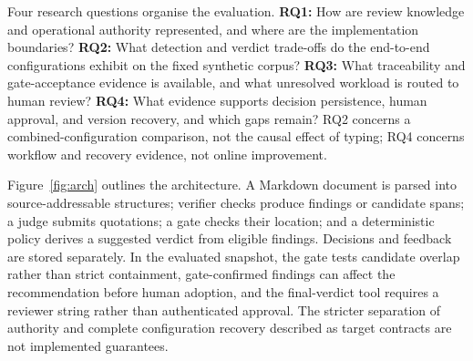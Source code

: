 \documentclass[computers,article,submit,moreauthors]{Definitions/mdpi}
\begin{document}
Four research questions organise the evaluation. \textbf{RQ1:} How are review knowledge and operational authority represented, and where are the implementation boundaries? \textbf{RQ2:} What detection and verdict trade-offs do the end-to-end configurations exhibit on the fixed synthetic corpus? \textbf{RQ3:} What traceability and gate-acceptance evidence is available, and what unresolved workload is routed to human review? \textbf{RQ4:} What evidence supports decision persistence, human approval, and version recovery, and which gaps remain? RQ2 concerns a combined-configuration comparison, not the causal effect of typing; RQ4 concerns workflow and recovery evidence, not online improvement.

Figure~\ref{fig:arch} outlines the architecture. A Markdown document is parsed into source-addressable structures; verifier checks produce findings or candidate spans; a judge submits quotations; a gate checks their location; and a deterministic policy derives a suggested verdict from eligible findings. Decisions and feedback are stored separately. In the evaluated snapshot, the gate tests candidate overlap rather than strict containment, gate-confirmed findings can affect the recommendation before human adoption, and the final-verdict tool requires a reviewer string rather than authenticated approval. The stricter separation of authority and complete configuration recovery described as target contracts are not implemented guarantees.
\end{document}
